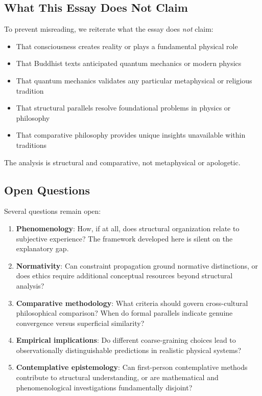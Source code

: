 \documentclass[11pt,a4paper]{article}
\begin{document}
\subsection{What This Essay Does Not Claim}

To prevent misreading, we reiterate what the essay does \emph{not} claim:

\begin{itemize}
\item That consciousness creates reality or plays a fundamental physical role
\item That Buddhist texts anticipated quantum mechanics or modern physics
\item That quantum mechanics validates any particular metaphysical or religious tradition
\item That structural parallels resolve foundational problems in physics or philosophy
\item That comparative philosophy provides unique insights unavailable within traditions
\end{itemize}

The analysis is structural and comparative, not metaphysical or apologetic.

\subsection{Open Questions}

Several questions remain open:

\begin{enumerate}
\item \textbf{Phenomenology}: How, if at all, does structural organization relate to subjective experience? The framework developed here is silent on the explanatory gap.

\item \textbf{Normativity}: Can constraint propagation ground normative distinctions, or does ethics require additional conceptual resources beyond structural analysis?

\item \textbf{Comparative methodology}: What criteria should govern cross-cultural philosophical comparison? When do formal parallels indicate genuine convergence versus superficial similarity?

\item \textbf{Empirical implications}: Do different coarse-graining choices lead to observationally distinguishable predictions in realistic physical systems?

\item \textbf{Contemplative epistemology}: Can first-person contemplative methods contribute to structural understanding, or are mathematical and phenomenological investigations fundamentally disjoint?
\end{enumerate}
\end{document}
